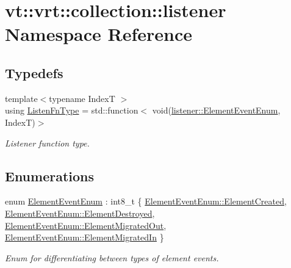 \hypertarget{namespacevt_1_1vrt_1_1collection_1_1listener}{}\section{vt\+:\+:vrt\+:\+:collection\+:\+:listener Namespace Reference}
\label{namespacevt_1_1vrt_1_1collection_1_1listener}
\subsection*{Typedefs}
\begin{DoxyCompactItemize}
\item 
{\footnotesize template$<$typename IndexT $>$ }\\using \hyperlink{namespacevt_1_1vrt_1_1collection_1_1listener_a62d04c44a3c187eae66bdba2090b4505}{Listen\+Fn\+Type} = std\+::function$<$ void(\hyperlink{namespacevt_1_1vrt_1_1collection_1_1listener_a96ace4b58b3d91759e7abda5cc33b012}{listener\+::\+Element\+Event\+Enum}, IndexT)$>$
\begin{DoxyCompactList}\small\item\em Listener function type. \end{DoxyCompactList}\end{DoxyCompactItemize}
\subsection*{Enumerations}
\begin{DoxyCompactItemize}
\item 
enum \hyperlink{namespacevt_1_1vrt_1_1collection_1_1listener_a96ace4b58b3d91759e7abda5cc33b012}{Element\+Event\+Enum} \+: int8\+\_\+t \{ \hyperlink{namespacevt_1_1vrt_1_1collection_1_1listener_a96ace4b58b3d91759e7abda5cc33b012a13f83c592fd326a19a0b4e5196bcbc27}{Element\+Event\+Enum\+::\+Element\+Created}, 
\hyperlink{namespacevt_1_1vrt_1_1collection_1_1listener_a96ace4b58b3d91759e7abda5cc33b012a74a4ebfb91a5d2efd17810fcf21b0d6a}{Element\+Event\+Enum\+::\+Element\+Destroyed}, 
\hyperlink{namespacevt_1_1vrt_1_1collection_1_1listener_a96ace4b58b3d91759e7abda5cc33b012a83a275aac9439b3fe0cff1b3f685d14d}{Element\+Event\+Enum\+::\+Element\+Migrated\+Out}, 
\hyperlink{namespacevt_1_1vrt_1_1collection_1_1listener_a96ace4b58b3d91759e7abda5cc33b012a52681015b599c7461eeea5c717df6a25}{Element\+Event\+Enum\+::\+Element\+Migrated\+In}
 \}\begin{DoxyCompactList}\small\item\em Enum for differentiating between types of element events. \end{DoxyCompactList}
\end{DoxyCompactItemize}


